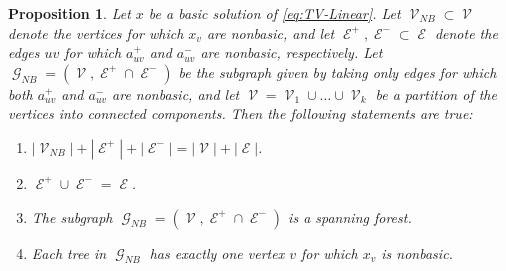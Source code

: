 \documentclass[pdflatex,sn-mathphys-num]{sn-jnl}%
\newtheorem{prop}[theorem]{Proposition}
\DeclareMathOperator{\Gcal}{\mathcal{G}}
\DeclareMathOperator{\Ecal}{\mathcal{E}}
\DeclareMathOperator{\Vcal}{\mathcal{V}}
\begin{document}
\begin{prop} \label{prop:tv-linear-basic}
    Let $x$ be a basic solution of \eqref{eq:TV-Linear}. Let $\Vcal_{NB} \subset \Vcal$ denote the vertices for which $x_v$ are nonbasic, and let $\Ecal^+, \Ecal^- \subset \Ecal$ denote the edges $uv$ for which $a_{uv}^+$ and $a_{uv}^-$ are nonbasic, respectively. Let $\Gcal_{NB} = (\Vcal, \Ecal^+ \cap \Ecal^-)$ be the subgraph given by taking only edges for which both $a_{uv}^+$ and $a_{uv}^-$ are nonbasic, and let $\Vcal = \Vcal_1 \cup\dots \cup \Vcal_k$ be a partition of the vertices into connected components. Then the following statements are true:
    \begin{enumerate}
        \item $|\Vcal_{NB}| + |\Ecal^+| + |\Ecal^-| = |\Vcal| + |\Ecal|$.
        \item $\Ecal^+ \cup \Ecal^- = \Ecal$.
        \item The subgraph $\Gcal_{NB} = (\Vcal, \Ecal^+ \cap \Ecal^-)$ is a spanning forest. 
        \item Each tree in $\Gcal_{NB}$ has exactly one vertex $v$ for which $x_v$ is nonbasic.
    \end{enumerate}
\end{prop}
\end{document}
